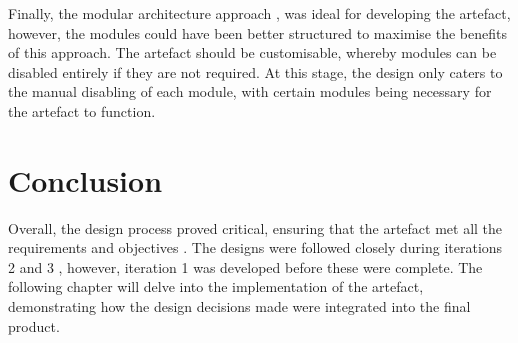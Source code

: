 Finally, the modular architecture approach , was ideal for developing the artefact, however, the modules could have been better structured to maximise the benefits of this approach. The artefact should be customisable, whereby modules can be disabled entirely if they are not required. At this stage, the design only caters to the manual disabling of each module, with certain modules being necessary for the artefact to function.

\section{Conclusion}
\label{design:conclusion}

Overall, the design process proved critical, ensuring that the artefact met all the requirements  and objectives . The designs were followed closely during iterations 2 and 3 , however, iteration 1  was developed before these were complete. The following chapter will delve into the implementation of the artefact, demonstrating how the design decisions made were integrated into the final product.
